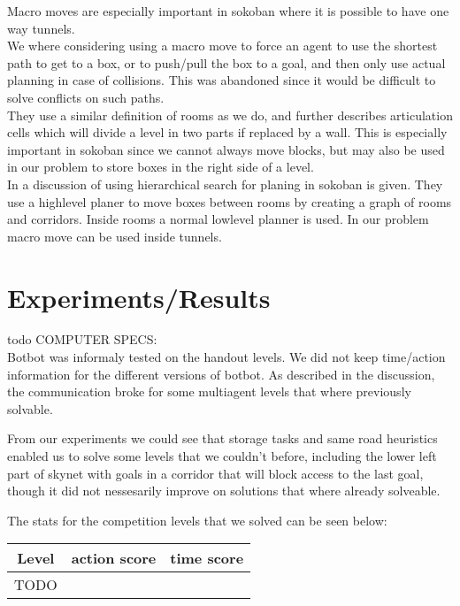\documentclass[letterpaper]{article}
\begin{document}
Macro moves are especially important in sokoban where it is possible to have
one way tunnels.\\

We where considering using a macro move to force an agent to use the shortest
path to get to a box, or to push/pull the box to a goal, and then only use actual
planning in case of collisions. This was abandoned since it would be difficult
to solve conflicts on such paths.\\

They use a similar definition of rooms as we do, and further describes articulation
cells which will divide a level in two parts if replaced by a wall. This is
especially important in sokoban since we cannot always move blocks, but may
also be used in our problem to store boxes in the right side of a level.\\

In \cite{highlevelSokoban} a discussion of using hierarchical search for
planing in sokoban is given. They use a highlevel planer to move boxes between
rooms by creating a graph of rooms and corridors. Inside rooms a normal lowlevel
planner is used. In our problem macro move can be used inside tunnels.

\section{Experiments/Results}
todo COMPUTER SPECS:\\

Botbot was informaly tested on the handout levels. We did not keep time/action
information for the different versions of botbot. As described in the discussion,
the communication broke for some multiagent levels that where previously solvable.

From our experiments we could see that storage tasks and same road heuristics enabled
us to solve some levels that we couldn't before, including the lower left part of skynet
with goals in a corridor that will block access to the last goal, though it did not
nessesarily improve on solutions that where already solveable.

The stats for the competition levels that we solved can be seen below:\\

\begin{tabular}{c|c|c}
Level & action score & time score \\
\hline
TODO
\end{tabular}\\
\end{document}
